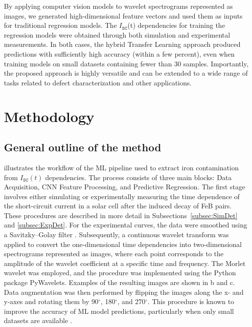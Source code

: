 \documentclass[10pt]{iopart}
\begin{document}
By applying computer vision models to wavelet spectrograms represented as images, we generated high-dimensional feature vectors and used them as inputs for traditional regression models.
The $I_\mathtt{SC}$(t) dependencies for training the regression models were obtained through both simulation and experimental measurements.
In both cases, the hybrid Transfer Learning approach produced predictions with sufficiently high accuracy (within a few percent), even when training models on small datasets containing fewer than 30 samples.
Importantly, the proposed approach is highly versatile and can be extended to a wide range of tasks related to defect characterization and other applications.


\section{Methodology}\label{sec:Exp}

\subsection{General outline of the method}\label{subsec:GenSch}

 illustrates the workflow of the ML pipeline used to extract iron contamination from $I_\mathtt{SC}(t)$ dependencies.
The process consists of three main blocks: Data Acquisition, CNN Feature Processing, and Predictive Regression.
The first stage involves either simulating or experimentally measuring the time dependence
of the short-circuit current in a solar cell after the induced decay of FeB pairs.
These procedures are described in more detail in Subsections~\ref{subsec:SimDet} and \ref{subsec:ExpDet}.
For the experimental curves, the data were smoothed using a Savitzky–Golay filter \cite{Krishnan2013}.
Subsequently, a continuous wavelet transform \cite{Torrence1998} was applied to convert the one-dimensional time dependencies
into two-dimensional spectrograms represented as images,
where each point corresponds to the amplitude of the wavelet coefficient at a specific time and frequency.
The Morlet wavelet was employed, and the procedure was implemented using the Python package PyWavelets.
Examples of the resulting images are shown in b and c.
Data augmentation was then performed by flipping the images along the x- and y-axes and rotating them by 90$^{\circ}$, 180$^{\circ}$, and 270$^{\circ}$.
This procedure is known to improve the accuracy of ML model predictions, particularly when only small datasets are available \cite{Ahmad2020}.
\end{document}
